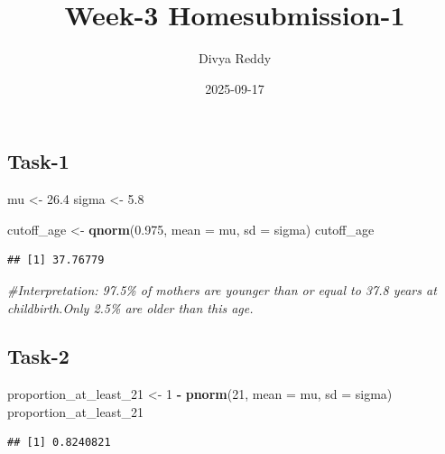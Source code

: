 \documentclass[
]{article}
\title{Week-3 Homesubmission-1}
\author{Divya Reddy}
\date{2025-09-17}
\newenvironment{Shaded}{\begin{snugshade}}{\end{snugshade}}
\newcommand{\AttributeTok}[1]{\textcolor[rgb]{0.13,0.29,0.53}{#1}}
\newcommand{\CommentTok}[1]{\textcolor[rgb]{0.56,0.35,0.01}{\textit{#1}}}
\newcommand{\DecValTok}[1]{\textcolor[rgb]{0.00,0.00,0.81}{#1}}
\newcommand{\FloatTok}[1]{\textcolor[rgb]{0.00,0.00,0.81}{#1}}
\newcommand{\FunctionTok}[1]{\textcolor[rgb]{0.13,0.29,0.53}{\textbf{#1}}}
\newcommand{\NormalTok}[1]{#1}
\newcommand{\OtherTok}[1]{\textcolor[rgb]{0.56,0.35,0.01}{#1}}
\newcommand{\SpecialCharTok}[1]{\textcolor[rgb]{0.81,0.36,0.00}{\textbf{#1}}}
\begin{document}
\maketitle

\subsection{Task-1}\label{task-1}

\begin{Shaded}
\begin{Highlighting}[]
\NormalTok{mu    }\OtherTok{\textless{}{-}} \FloatTok{26.4}
\NormalTok{sigma }\OtherTok{\textless{}{-}} \FloatTok{5.8}

\NormalTok{cutoff\_age }\OtherTok{\textless{}{-}} \FunctionTok{qnorm}\NormalTok{(}\FloatTok{0.975}\NormalTok{, }\AttributeTok{mean =}\NormalTok{ mu, }\AttributeTok{sd =}\NormalTok{ sigma)}
\NormalTok{cutoff\_age}
\end{Highlighting}
\end{Shaded}

\begin{verbatim}
## [1] 37.76779
\end{verbatim}

\begin{Shaded}
\begin{Highlighting}[]
\CommentTok{\#Interpretation: 97.5\% of mothers are younger than or equal to 37.8 years at childbirth.Only 2.5\% are older than this age.}
\end{Highlighting}
\end{Shaded}

\subsection{Task-2}\label{task-2}

\begin{Shaded}
\begin{Highlighting}[]
\NormalTok{proportion\_at\_least\_21 }\OtherTok{\textless{}{-}} \DecValTok{1} \SpecialCharTok{{-}} \FunctionTok{pnorm}\NormalTok{(}\DecValTok{21}\NormalTok{, }\AttributeTok{mean =}\NormalTok{ mu, }\AttributeTok{sd =}\NormalTok{ sigma)}
\NormalTok{proportion\_at\_least\_21}
\end{Highlighting}
\end{Shaded}

\begin{verbatim}
## [1] 0.8240821
\end{verbatim}
\end{document}
